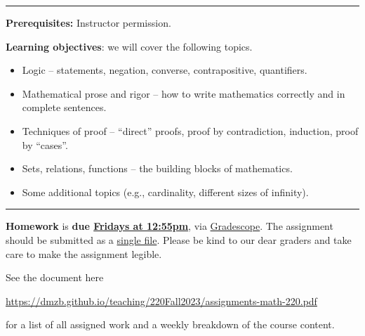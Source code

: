 \documentclass[12pt]{article}
\begin{document}
\hrule
\medskip

\noindent\textbf{Prerequisites:} Instructor permission.
\smallskip


\noindent \textbf{Learning objectives}: we will cover the following topics.

\begin{itemize}
\item Logic -- statements, negation, converse, contrapositive, quantifiers. \vspace{-5pt}
\item Mathematical prose and rigor -- how to write mathematics
  correctly and in complete sentences.\vspace{-5pt}
\item Techniques of proof -- ``direct'' proofs, proof by contradiction, induction, proof by ``cases''. \vspace{-5pt}
\item Sets, relations, functions -- the building blocks of mathematics. \vspace{-5pt}
\item Some additional topics (e.g., cardinality, different sizes of infinity).
\end{itemize}


\hrule
\medskip

\noindent \textbf{Homework} is \textbf{due \underline{Fridays at 12:55pm}}, via \underline{Gradescope}. The assignment should be submitted as a \underline{single file}. Please be kind to our dear graders and take care to make the assignment legible.
\smallskip

\noindent See the document here
\begin{center}
  \url{https://dmzb.github.io/teaching/220Fall2023/assignments-math-220.pdf}
\end{center}
for a list of all assigned work and a weekly breakdown of the course content.
\medskip

\end{document}
